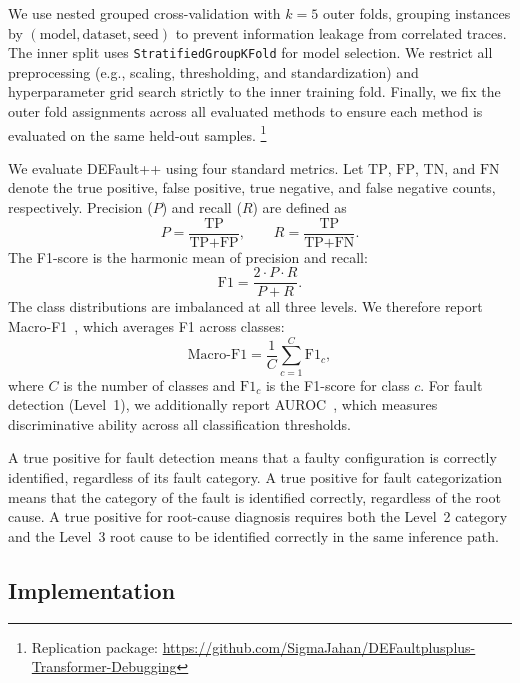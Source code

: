 We use nested grouped cross-validation with $k=5$ outer folds, grouping instances by $(\text{model}, \text{dataset}, \text{seed})$ to prevent information leakage from correlated traces. The inner split uses \texttt{StratifiedGroupKFold} for model selection. We restrict all preprocessing (e.g., scaling, thresholding, and standardization) and hyperparameter grid search strictly to the inner training fold. Finally, we fix the outer fold assignments across all evaluated methods to ensure each method is evaluated on the same held-out samples. \footnote{Replication package: \url{https://github.com/SigmaJahan/DEFaultplusplus-Transformer-Debugging}}

We evaluate DEFault++ using four standard metrics. Let $\text{TP}$, $\text{FP}$, $\text{TN}$, and $\text{FN}$ denote the true positive, false positive, true negative, and false negative counts, respectively. Precision ($P$) and recall ($R$) are defined as
\begin{equation}
P = \frac{\text{TP}}{\text{TP} + \text{FP}}, \qquad R = \frac{\text{TP}}{\text{TP} + \text{FN}}.
\label{eq:prec_recall}
\end{equation}
The F1-score is the harmonic mean of precision and recall:
\begin{equation}
\text{F1} = \frac{2 \cdot P \cdot R}{P + R}.
\label{eq:f1}
\end{equation}
The class distributions are imbalanced at all three levels. We therefore report Macro-F1~\cite{naidu2023review}, which averages F1 across classes:
\begin{equation}
\text{Macro-F1} = \frac{1}{C} \sum_{c=1}^{C} \text{F1}_c,
\label{eq:macro_f1}
\end{equation}
where $C$ is the number of classes and $\text{F1}_c$ is the F1-score for class $c$. For fault detection (Level~1), we additionally report AUROC~\cite{bradley1997use}, which measures discriminative ability across all classification thresholds.

A true positive for fault detection means that a faulty configuration is correctly identified, regardless of its fault category. A true positive for fault categorization means that the category of the fault is identified correctly, regardless of the root cause. A true positive for root-cause diagnosis requires both the Level~2 category and the Level~3 root cause to be identified correctly in the same inference path.

\subsection{Implementation}

